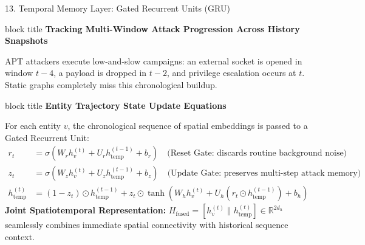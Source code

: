 \documentclass[aspectratio=169,10pt]{beamer}
\begin{document}
\begin{frame}[t]{13. Temporal Memory Layer: Gated Recurrent Units (GRU)}
\vspace{-0.2em}
\begin{beamercolorbox}[rounded=true,shadow=false,sep=0.30em,wd=\textwidth]{block title}
\textbf{\scriptsize Tracking Multi-Window Attack Progression Across History Snapshots}
\end{beamercolorbox}
\vspace{0.10em}
{\fontsize{7.2pt}{10.2pt}\selectfont
APT attackers execute low-and-slow campaigns: an external socket is opened in window $t-4$, a payload is dropped in $t-2$, and privilege escalation occurs at $t$. Static graphs completely miss this chronological buildup.
}

\vspace{0.25em}

\begin{beamercolorbox}[rounded=true,shadow=false,sep=0.30em,wd=\textwidth]{block title}
\textbf{\scriptsize Entity Trajectory State Update Equations}
\end{beamercolorbox}
\vspace{0.10em}
{\fontsize{7.0pt}{9.8pt}\selectfont
For each entity $v$, the chronological sequence of spatial embeddings is passed to a Gated Recurrent Unit:
\begin{align*}
r_t &= \sigma(W_r h_v^{(t)} + U_r h_{\text{temp}}^{(t-1)} + b_r) \quad \text{(Reset Gate: discards routine background noise)} \\
z_t &= \sigma(W_z h_v^{(t)} + U_z h_{\text{temp}}^{(t-1)} + b_z) \quad \text{(Update Gate: preserves multi-step attack memory)} \\
h_{\text{temp}}^{(t)} &= (1 - z_t) \odot h_{\text{temp}}^{(t-1)} + z_t \odot \tanh(W_h h_v^{(t)} + U_h (r_t \odot h_{\text{temp}}^{(t-1)}) + b_h)
\end{align*}
\textbf{Joint Spatiotemporal Representation:} $H_{\text{fused}} = [h_v^{(t)} \parallel h_{\text{temp}}^{(t)}] \in \mathbb{R}^{2d_h}$ seamlessly combines immediate spatial connectivity with historical sequence context.
}
\end{frame}
\end{document}
